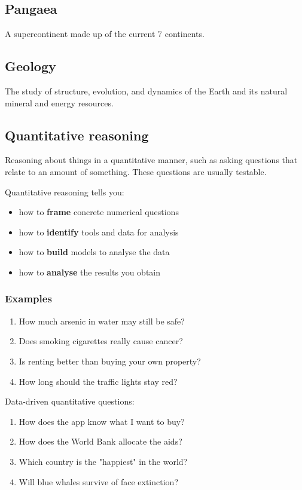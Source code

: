 \documentclass[11pt]{article}
\begin{document}
\subsection{Pangaea}
\label{sec:org420333b}
A supercontinent made up of the current 7 continents.

\subsection{Geology}
\label{sec:orgb323a3d}
The study of structure, evolution, and dynamics of the Earth and its natural mineral and energy resources.

\subsection{Quantitative reasoning}
\label{sec:org487d385}
Reasoning about things in a quantitative manner, such as asking questions that relate to an amount of something. These questions are usually testable.

Quantitative reasoning tells you:
\begin{itemize}
\item how to \textbf{frame} concrete numerical questions
\item how to \textbf{identify} tools and data for analysis
\item how to \textbf{build} models to analyse the data
\item how to \textbf{analyse} the results you obtain
\end{itemize}

\subsubsection{Examples}
\label{sec:org19d9c16}
\begin{enumerate}
\item How much arsenic in water may still be safe?
\item Does smoking cigarettes really cause cancer?
\item Is renting better than buying your own property?
\item How long should the traffic lights stay red?
\end{enumerate}

Data-driven quantitative questions:
\begin{enumerate}
\item How does the app know what I want to buy?
\item How does the World Bank allocate the aids?
\item Which country is the "happiest" in the world?
\item Will blue whales survive of face extinction?
\end{enumerate}
\end{document}
